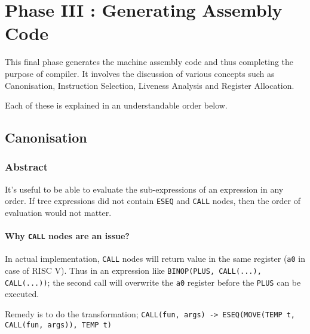\chapter{Phase III : Generating Assembly Code}

This final phase generates the machine assembly code and thus completing the purpose of compiler. 
It involves the discussion of various concepts such as Canonisation, Instruction Selection, Liveness Analysis and Register Allocation.

Each of these is explained in an understandable order below.

\section{Canonisation}


\hypertarget{abstract}{%
\subsection{Abstract}\label{abstract}}

It's useful to be able to evaluate the sub-expressions of an expression
in any order. If tree expressions did not contain
\texttt{ESEQ}
and
\texttt{CALL}
nodes, then the order of evaluation would not matter.

\hypertarget{why-call-nodes-are-an-issue}{%
\subsubsection{\texorpdfstring{Why
\texttt{CALL}
nodes are an
issue?}{Why  nodes are an issue?}}\label{why-call-nodes-are-an-issue}}

In actual implementation,
\texttt{CALL}
nodes will return value in the same register
(\texttt{a0} in
case of RISC V). Thus in an expression like
\texttt{BINOP(PLUS, CALL(...), CALL(...))};
the second call will overwrite the
\texttt{a0}
register before the
\texttt{PLUS}
can be executed.

Remedy is to do the transformation;
\texttt{CALL(fun, args) -> ESEQ(MOVE(TEMP t, CALL(fun, args)), TEMP t)}

